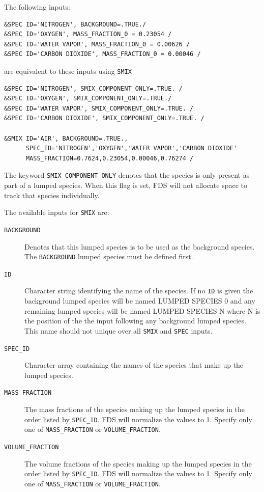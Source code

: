 \documentclass[11pt]{book}
\newcommand{\ct}{\tt\small}
\begin{document}
The following inputs:

\footnotesize
\begin{verbatim}
&SPEC ID='NITROGEN', BACKGROUND=.TRUE./
&SPEC ID='OXYGEN', MASS_FRACTION_0 = 0.23054 /
&SPEC ID='WATER VAPOR', MASS_FRACTION_0 = 0.00626 /
&SPEC ID='CARBON DIOXIDE', MASS_FRACTION_0 = 0.00046 /
\end{verbatim} \normalsize

\noindent
are equivalent to these inputs using {\ct SMIX}

\footnotesize
\begin{verbatim}
&SPEC ID='NITROGEN', SMIX_COMPONENT_ONLY=.TRUE. /
&SPEC ID='OXYGEN', SMIX_COMPONENT_ONLY=.TRUE./
&SPEC ID='WATER VAPOR', SMIX_COMPONENT_ONLY=.TRUE. /
&SPEC ID='CARBON DIOXIDE', SMIX_COMPONENT_ONLY=.TRUE. /

&SMIX ID='AIR', BACKGROUND=.TRUE.,
      SPEC_ID='NITROGEN','OXYGEN','WATER VAPOR','CARBON DIOXIDE'
      MASS_FRACTION=0.7624,0.23054,0.00046,0.76274 /
\end{verbatim} \normalsize

\noindent
The keyword {\ct SMIX\_COMPONENT\_ONLY} denotes that the species is only present as part of a lumped species.
When this flag is set, FDS will not allocate space to track that species individually.

The available inputs for {\ct SMIX} are:

\begin{description}
\item[{\ct BACKGROUND}] Denotes that this lumped species is to be used as the background species.  The {\ct BACKGROUND} lumped species must be defined first.
\item[{\ct ID}] Character string identifying the name of the species.  If no {\ct ID} is given the background lumped species will be named LUMPED SPECIES 0
and any remaining lumped species will be named LUMPED SPECIES N where N is the position of the the input following any background lumped species.   This name should not unique over all {\ct SMIX} and {\ct SPEC} inputs.
\item[{\ct SPEC\_ID}] Character array containing the names of the species that make up the lumped species.
\item[{\ct MASS\_FRACTION}] The mass fractions of the species making up the lumped species in the order listed by {\ct SPEC\_ID}.  FDS will normalize the values to 1.
Specify only one of {\ct MASS\_FRACTION} or {\ct VOLUME\_FRACTION}.
\item[{\ct VOLUME\_FRACTION}]  The volume fractions of the species making up the lumped species in the order listed by {\ct SPEC\_ID}.  FDS will normalize the values to 1.
Specify only one of {\ct MASS\_FRACTION} or {\ct VOLUME\_FRACTION}.
\end{description}
\end{document}
